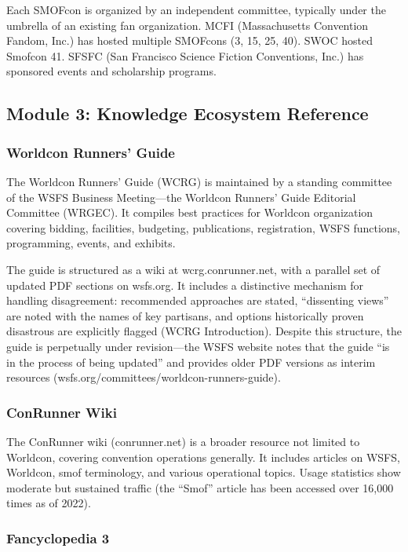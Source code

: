 \documentclass[11pt,letterpaper]{article}
\begin{document}
Each SMOFcon is organized by an independent committee, typically under the umbrella of an existing fan organization. MCFI (Massachusetts Convention Fandom, Inc.) has hosted multiple SMOFcons (3, 15, 25, 40). SWOC hosted Smofcon 41. SFSFC (San Francisco Science Fiction Conventions, Inc.) has sponsored events and scholarship programs.

\subsection{Module 3: Knowledge Ecosystem Reference}

\subsubsection{Worldcon Runners' Guide}

The Worldcon Runners' Guide (WCRG) is maintained by a standing committee of the WSFS Business Meeting---the Worldcon Runners' Guide Editorial Committee (WRGEC). It compiles best practices for Worldcon organization covering bidding, facilities, budgeting, publications, registration, WSFS functions, programming, events, and exhibits.

The guide is structured as a wiki at wcrg.conrunner.net, with a parallel set of updated PDF sections on wsfs.org. It includes a distinctive mechanism for handling disagreement: recommended approaches are stated, ``dissenting views'' are noted with the names of key partisans, and options historically proven disastrous are explicitly flagged (WCRG Introduction). Despite this structure, the guide is perpetually under revision---the WSFS website notes that the guide ``is in the process of being updated'' and provides older PDF versions as interim resources (wsfs.org/committees/worldcon-runners-guide).

\subsubsection{ConRunner Wiki}

The ConRunner wiki (conrunner.net) is a broader resource not limited to Worldcon, covering convention operations generally. It includes articles on WSFS, Worldcon, smof terminology, and various operational topics. Usage statistics show moderate but sustained traffic (the ``Smof'' article has been accessed over 16,000 times as of 2022).

\subsubsection{Fancyclopedia 3}
\end{document}
